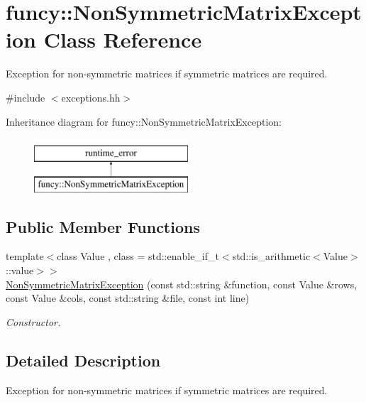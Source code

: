 \hypertarget{classfuncy_1_1NonSymmetricMatrixException}{\section{funcy\-:\-:Non\-Symmetric\-Matrix\-Exception Class Reference}
\label{classfuncy_1_1NonSymmetricMatrixException}
}


Exception for non-\/symmetric matrices if symmetric matrices are required.  




{\ttfamily \#include $<$exceptions.\-hh$>$}

Inheritance diagram for funcy\-:\-:Non\-Symmetric\-Matrix\-Exception\-:\begin{figure}[H]
\begin{center}
\leavevmode
\includegraphics[height=2.000000cm]{classfuncy_1_1NonSymmetricMatrixException}
\end{center}
\end{figure}
\subsection*{Public Member Functions}
\begin{DoxyCompactItemize}
\item 
{\footnotesize template$<$class Value , class  = std\-::enable\-\_\-if\-\_\-t$<$std\-::is\-\_\-arithmetic$<$\-Value$>$\-::value$>$$>$ }\\\hyperlink{classfuncy_1_1NonSymmetricMatrixException_a647b908f67a98103f79dec5753560e22}{Non\-Symmetric\-Matrix\-Exception} (const std\-::string \&function, const Value \&rows, const Value \&cols, const std\-::string \&file, const int line)
\begin{DoxyCompactList}\small\item\em Constructor. \end{DoxyCompactList}\end{DoxyCompactItemize}


\subsection{Detailed Description}
Exception for non-\/symmetric matrices if symmetric matrices are required. 

